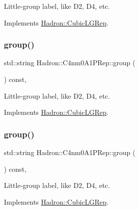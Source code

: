 Little-\/group label, like D2, D4, etc. 

Implements \mbox{\hyperlink{structHadron_1_1CubicLGRep_a9bdb14b519a611d21379ed96a3a9eb41}{Hadron\+::\+Cubic\+L\+G\+Rep}}.

\mbox{\label{structHadron_1_1C4nm0A1PRep_a0c0892a28bdda298fc36d578c433f30e}} 
\subsubsection{\texorpdfstring{group()}{group()}\hspace{0.1cm}{\footnotesize\ttfamily [2/3]}}
{\footnotesize\ttfamily std\+::string Hadron\+::\+C4nm0\+A1\+P\+Rep\+::group (\begin{DoxyParamCaption}{ }\end{DoxyParamCaption}) const\hspace{0.3cm}{\ttfamily [inline]}, {\ttfamily [virtual]}}

Little-\/group label, like D2, D4, etc. 

Implements \mbox{\hyperlink{structHadron_1_1CubicLGRep_a9bdb14b519a611d21379ed96a3a9eb41}{Hadron\+::\+Cubic\+L\+G\+Rep}}.

\mbox{\label{structHadron_1_1C4nm0A1PRep_a0c0892a28bdda298fc36d578c433f30e}} 
\subsubsection{\texorpdfstring{group()}{group()}\hspace{0.1cm}{\footnotesize\ttfamily [3/3]}}
{\footnotesize\ttfamily std\+::string Hadron\+::\+C4nm0\+A1\+P\+Rep\+::group (\begin{DoxyParamCaption}{ }\end{DoxyParamCaption}) const\hspace{0.3cm}{\ttfamily [inline]}, {\ttfamily [virtual]}}

Little-\/group label, like D2, D4, etc. 

Implements \mbox{\hyperlink{structHadron_1_1CubicLGRep_a9bdb14b519a611d21379ed96a3a9eb41}{Hadron\+::\+Cubic\+L\+G\+Rep}}.

\mbox{\label{structHadron_1_1C4nm0A1PRep_a16776c5723a87d39dce0e2c58297413f}} 
